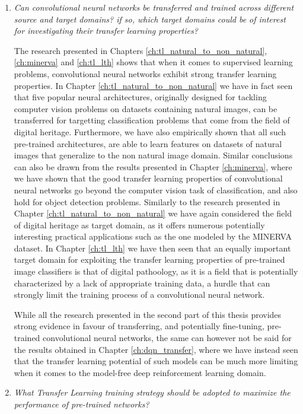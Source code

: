 \begin{enumerate}
	\item \textit{Can convolutional neural networks be transferred and trained across different source and target domains? if so, which target domains could be of interest for investigating their transfer learning properties?}
	
	The research presented in Chapters \ref{ch:tl_natural_to_non_natural}, \ref{ch:minerva} and \ref{ch:tl_lth} shows that when it comes to supervised learning problems, convolutional neural networks exhibit strong transfer learning properties. In Chapter \ref{ch:tl_natural_to_non_natural} we have in fact seen that five popular neural architectures, originally designed for tackling computer vision problems on datasets containing natural images, can be transferred for targetting classification problems that come from the field of digital heritage. Furthermore, we have also empirically shown that all such pre-trained architectures, are able to learn features on datasets of natural images that generalize to the non natural image domain. Similar conclusions can also be drawn from the results presented in Chapter \ref{ch:minerva}, where we have shown that the good transfer learning properties of convolutional neural networks go beyond the computer vision task of classification, and also hold for object detection problems. Similarly to the research presented in Chapter \ref{ch:tl_natural_to_non_natural} we have again considered the field of digital heritage as target domain, as it offers numerous potentially interesting practical applications such as the one modeled by the MINERVA dataset. In Chapter \ref{ch:tl_lth} we have then seen that an equally important target domain for exploiting the transfer learning properties of pre-trained image classifiers is that of digital pathoology, as it is a field that is potentially characterized by a lack of appropriate training data, a hurdle that can strongly limit the training process of a convolutional neural network.

	While all the research presented in the second part of this thesis provides strong evidence in favour of transferring, and potentially fine-tuning, pre-trained convolutional neural networks, the same can however not be said for the results obtained in Chapter \ref{ch:dqn_transfer}, where we have instead seen that the transfer learning potential of such models can be much more limiting when it comes to the model-free deep reinforcement learning domain. 

	
	\item \textit{What Transfer Learning training strategy should be adopted to maximize the performance of pre-trained networks?}


\end{enumerate}
